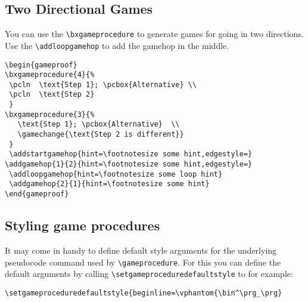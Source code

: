 \documentclass[a4paper]{report}
\begin{document}
\subsection{Two Directional Games}
You can use the \lstinline$\bxgameprocedure$ to generate games for going in two directions. Use the \lstinline$\addloopgamehop$
to add the gamehop in the middle.

\vspace{1cm}
\begin{center}
\begin{gameproof}
\end{gameproof}
\end{center}


\begin{lstlisting}
\begin{gameproof}
\bxgameprocedure{4}{%
 \pcln  \text{Step 1}; \pcbox{Alternative} \\
 \pcln  \text{Step 2}  
 }
\bxgameprocedure{3}{%
   \text{Step 1}; \pcbox{Alternative}  \\
   \gamechange{\text{Step 2 is different}}  
 }
 \addstartgamehop{hint=\footnotesize some hint,edgestyle=}
\addgamehop{1}{2}{hint=\footnotesize some hint,edgestyle=}
 \addloopgamehop{hint=\footnotesize some loop hint}
 \addgamehop{2}{1}{hint=\footnotesize some hint}
\end{gameproof}
\end{lstlisting}

\subsection{Styling game procedures}
It may come in handy to define default style arguments for the underlying pseudocode 
command used by \lstinline$\gameprocedure$. For this you can
define the default arguments by calling \lstinline{\setgameproceduredefaultstyle} to 
for example:

\begin{lstlisting}
\setgameproceduredefaultstyle{beginline=\vphantom{\bin^\prg_\prg}
\end{lstlisting}
\end{document}
